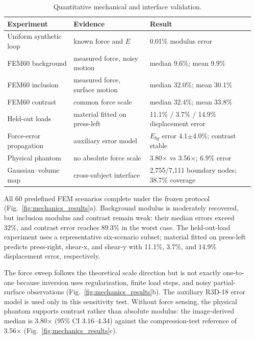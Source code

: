 \documentclass[smallextended]{svjour3}
\begin{document}
\begin{table}[htbp]
\centering
\caption{Quantitative mechanical and interface validation.}
\label{tab:mechanical_summary}
\small
\begin{tabular}{p{}p{}p{}}
\toprule
Experiment & Evidence & Result \\
\midrule
Uniform synthetic loop & known force and $E$ & 0.01\% modulus error \\
FEM60 background & measured force, noisy motion &
median 9.6\%; mean 9.9\% \\
FEM60 inclusion & measured force, surface motion &
median 32.0\%; mean 30.1\% \\
FEM60 contrast & common force scale &
median 32.4\%; mean 33.8\% \\
Held-out loads & material fitted on press-left &
11.1\% / 3.7\% / 14.9\% displacement error \\
Force-error propagation & auxiliary error model &
$E_{bg}$ error 4.1$\pm$4.0\%; contrast stable \\
Physical phantom & no absolute force scale &
3.80$\times$ vs 3.56$\times$; 6.9\% error \\
Gaussian--volume map & cross-subject interface &
2,755/7,111 boundary nodes; 38.7\% coverage \\
\bottomrule
\end{tabular}
\end{table}

All 60 predefined FEM scenarios complete under the frozen protocol
(Fig.~\ref{fig:mechanics_results}a). Background modulus is moderately
recovered, but inclusion modulus and contrast remain weak: their median
errors exceed 32\%, and contrast error reaches 89.3\% in the worst case.
The held-out-load experiment uses a representative six-scenario subset;
material fitted on press-left predicts press-right, shear-x, and shear-y
with 11.1\%, 3.7\%, and 14.9\% displacement error, respectively.

The force sweep follows the theoretical scale direction but is not exactly
one-to-one because inversion uses regularization, finite load steps, and
noisy partial-surface observations (Fig.~\ref{fig:mechanics_results}b).
The auxiliary R3D-18 error model is used only in this sensitivity test.
Without force sensing, the physical phantom supports contrast rather than
absolute modulus: the image-derived median is 3.80$\times$ (95\% CI
3.16--4.34) against the compression-test reference of 3.56$\times$
(Fig.~\ref{fig:mechanics_results}c).
\end{document}
